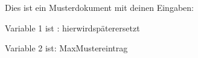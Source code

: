 \documentclass{article}
\newcommand{\variableeins}{hierwirdspäterersetzt}
\newcommand{\variablezwei}{MaxMustereintrag}
\begin{document}
Dies ist ein Musterdokument mit deinen Eingaben: \par
Variable 1 ist : \variableeins  \par
Variable 2 ist:  \variablezwei
\end{document}
